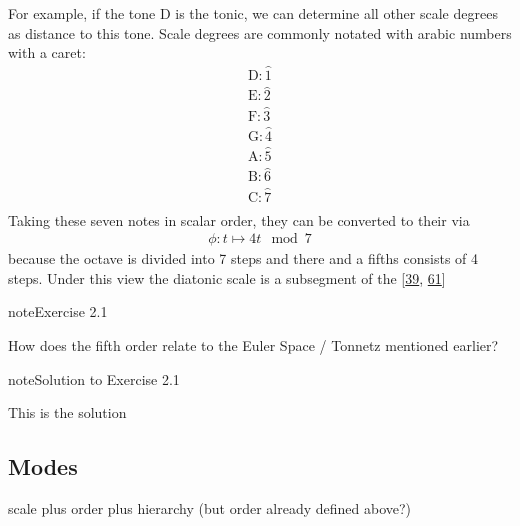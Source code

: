 \documentclass[letterpaper,10pt,english]{sphinxmanual}
\begin{document}
\sphinxAtStartPar
For example, if the tone D is the tonic, we can determine
all other scale degrees as distance to this tone.
Scale degrees are commonly notated with arabic numbers with a caret:
\begin{equation*}
\begin{split}\text{D}: \hat{1}\\
\text{E}: \hat{2}\\
\text{F}: \hat{3}\\
\text{G}: \hat{4}\\
\text{A}: \hat{5}\\
\text{B}: \hat{6}\\
\text{C}: \hat{7}\\\end{split}
\end{equation*}
\sphinxAtStartPar
Taking these seven notes in scalar order,
they can be converted to their  via
\begin{equation*}
\begin{split}\phi: t \mapsto 4t \mod 7\end{split}
\end{equation*}
\sphinxAtStartPar
because the octave is divided into 7 steps and there
and a fifths consists of 4 steps.
Under this view the diatonic scale is a subsegment
of the 
{[}\hyperlink{cite.8_bibliography:id48}{39}, \hyperlink{cite.8_bibliography:id44}{61}{]}
 \label{exercise:ex:tonnetz}

\begin{sphinxadmonition}{note}{Exercise 2.1}



\sphinxAtStartPar
How does the fifth order relate to the Euler Space / Tonnetz mentioned earlier?
\end{sphinxadmonition}
 \label{2_scales_modes:sol:tonnetz}

\begin{sphinxadmonition}{note}{Solution to Exercise 2.1}



\sphinxAtStartPar
This is the solution
\end{sphinxadmonition}


\subsection{Modes}
\label{\detokenize{2_scales_modes:modes}}
\sphinxAtStartPar
scale plus order plus hierarchy (but order already defined above?)
\end{document}
